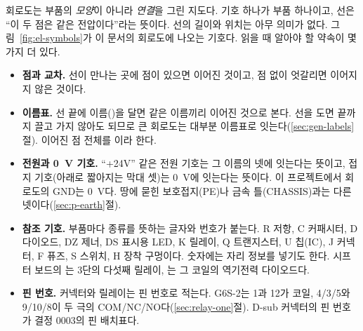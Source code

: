 \Why 회로도는 부품의 \emph{모양}이 아니라 \emph{연결}을 그린 지도다. 기호 하나가 부품 하나이고, 선은 ``이 두 점은 같은
전압이다''라는 뜻이다. 선의 길이와 위치는 아무 의미가 없다. 그림~\ref{fig:el-symbols}가 이 문서의 회로도에 나오는 기호다. 읽을 때
알아야 할 약속이 몇 가지 더 있다.
\begin{itemize}
\item \textbf{점과 교차.} 선이 만나는 곳에 점이 있으면 이어진 것이고, 점 없이 엇갈리면 이어지지 않은 것이다.
\item \textbf{이름표.} 선 끝에 이름()을 달면 같은 이름끼리 이어진 것으로 본다. 선을 도면 끝까지
끌고 가지 않아도 되므로 큰 회로도는 대부분 이름표로 잇는다(\ref{sec:gen-labels}절). 이어진 점 전체를
이라 한다.
\item \textbf{전원과 0~V 기호.} ``+24V'' 같은 전원 기호는 그 이름의 넷에 잇는다는 뜻이고, 접지 기호(아래로 짧아지는 막대
셋)는 0~V에 잇는다는 뜻이다. 이 프로젝트에서 회로도의 GND는 0~V다. 땅에 묻힌 보호접지(PE)나 금속 틀(CHASSIS)과는 다른
넷이다(\ref{sec:p-earth}절).
\item \textbf{참조 기호.} 부품마다 종류를 뜻하는 글자와 번호가 붙는다. R 저항, C 커패시터, D 다이오드, DZ 제너, DS 표시용
LED, K 릴레이, Q 트랜지스터, U 칩(IC), J 커넥터, F 퓨즈, S 스위치, H 장착 구멍이다. 숫자에는 자리 정보를 넣기도 한다.
시프터 보드의 는 3단의 다섯째 릴레이, 는 그 코일의 역기전력 다이오드다.
\item \textbf{핀 번호.} 커넥터와 릴레이는 핀 번호로 적는다. G6S-2는 1과 12가 코일, 4/3/5와 9/10/8이 두 극의
COM/NC/NO다(\ref{sec:relay-one}절). D-sub 커넥터의 핀 번호가 결정 0003의 핀 배치표다.
\end{itemize}

